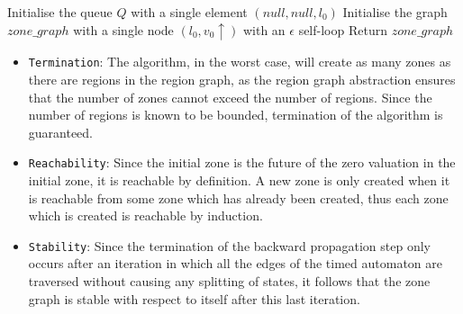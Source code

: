 \documentclass{article}
\begin{document}
\begin{algorithm2e}[H]
  Initialise the queue $Q$ with a single element $(null, null, l_0)$\;
  Initialise the graph $zone\_graph$ with a single node $(l_0, v_0 \uparrow)$
  with an $\epsilon$ self-loop\;
  Return $zone\_graph$\;
\end{algorithm2e}

\begin{itemize}

\item \texttt{Termination}: The algorithm, in the worst case,
  will create as many zones as there are regions in the region graph,
  as the region graph abstraction ensures that the number of zones
  cannot exceed the number of regions. Since the number of regions is
  known to be bounded, termination of the algorithm is
  guaranteed.

\item \texttt{Reachability}: Since the initial zone is the future of
  the zero valuation in the initial zone, it is reachable by
  definition. A new zone is only created when it is reachable from some
  zone which has already been created, thus each zone which is created
  is reachable by induction.

\item \texttt{Stability}: Since the termination of the backward
  propagation step only occurs after an iteration in which all the
  edges of the timed automaton are traversed without causing any
  splitting of states, it follows that the zone graph is stable with
  respect to itself after this last iteration.

\end{itemize}



\end{document}

